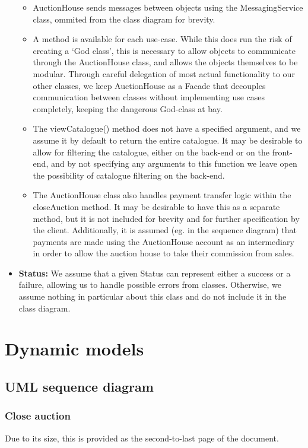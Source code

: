 \documentclass[titlepage, 12pt]{extarticle}
\begin{document}
\begin{itemize}
\begin{itemize}
    \item AuctionHouse sends messages between objects using the MessagingService class, ommited from the class diagram for brevity.
    \item A method is available for each use-case. While this does run the risk of creating a `God class', this is necessary to allow objects to communicate through the AuctionHouse class, and allows the objects themselves to be modular. Through careful delegation of most actual functionality to our other classes, we keep AuctionHouse as a Facade that decouples communication between classes without implementing use cases completely, keeping the dangerous God-class at bay.
    \item The viewCatalogue() method does not have a specified argument, and we assume it by default to return the entire catalogue. It may be desirable to allow for filtering the catalogue, either on the back-end or on the front-end, and by not specifying any arguments to this function we leave open the possibility of catalogue filtering on the back-end. 
    \item The AuctionHouse class also handles payment transfer logic within the closeAuction method. It may be desirable to have this as a separate method, but it is not included for brevity and for further specification by the client. Additionally, it is assumed (eg. in the sequence diagram) that payments are made using the AuctionHouse account as an intermediary in order to allow the auction house to take their commission from sales.
  \end{itemize}
\item {\bf Status: } We assume that a given Status can represent either a success or a failure, allowing us to handle possible errors from classes. Otherwise, we assume nothing in particular about this class and do not include it in the class diagram. 
\end{itemize}
\section{Dynamic models}
\subsection{UML sequence diagram}
\subsubsection{Close auction}
Due to its size, this is provided as the second-to-last page of the document.
\end{document}
